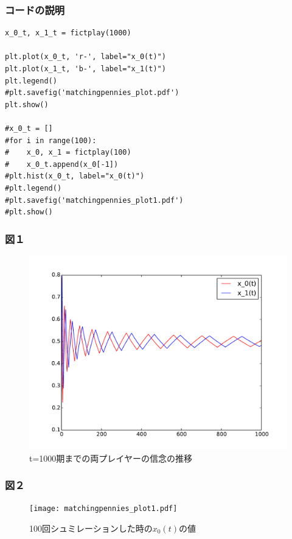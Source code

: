 \documentclass[dvipdfmx,fleqn,handout]{beamer}
\begin{document}
\begin{frame}[containsverbatim]%
\frametitle{コードの説明}

\begin{verbatim}
x_0_t, x_1_t = fictplay(1000)
         
plt.plot(x_0_t, 'r-', label="x_0(t)")
plt.plot(x_1_t, 'b-', label="x_1(t)")
plt.legend()
#plt.savefig('matchingpennies_plot.pdf')
plt.show()

#x_0_t = []
#for i in range(100):
#    x_0, x_1 = fictplay(100)
#    x_0_t.append(x_0[-1])
#plt.hist(x_0_t, label="x_0(t)")
#plt.legend()
#plt.savefig('matchingpennies_plot1.pdf')
#plt.show()
\end{verbatim}
\end{frame}

\begin{frame}
\frametitle{図１}
\begin{figure}
 \centering
 \includegraphics[scale=0.5]{matchingpennies_plot.pdf}
 \caption{t=1000期までの両プレイヤーの信念の推移}
 \label{fig:matchingpennies_plot}
\end{figure}
\end{frame}

\begin{frame}
\frametitle{図２}
\begin{figure}
 \centering
 \texttt{[image: matchingpennies\_plot1.pdf]}
 \caption{100回シュミレーションした時の$x_0(t)$の値}
 \label{fig:matchingpennies_plot}
\end{figure}
\end{frame}
\end{document}
